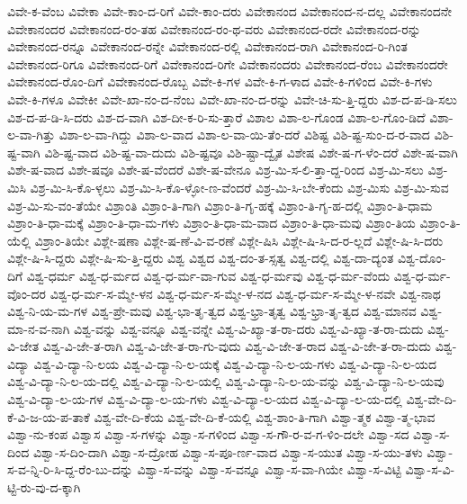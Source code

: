 {ವಿವೇ-ಕ-ವೆಂಬ
ವಿವೇಕಾ
ವಿವೇ-ಕಾಂ-ದ-ರಿಗೆ
ವಿವೇ-ಕಾಂ-ದರು
ವಿವೇಕಾನಂದ
ವಿವೇಕಾನಂದ-ನ-ದಲ್ಲ
ವಿವೇಕಾನಂದನೇ
ವಿವೇಕಾನಂದರ
ವಿವೇಕಾನಂದ-ರಂ-ತಹ
ವಿವೇಕಾನಂದ-ರಂ-ಥ-ವರು
ವಿವೇಕಾನಂದ-ರದೇ
ವಿವೇಕಾನಂದ-ರನ್ನು
ವಿವೇಕಾನಂದ-ರನ್ನೂ
ವಿವೇಕಾನಂದ-ರನ್ನೇ
ವಿವೇಕಾನಂದ-ರಲ್ಲಿ
ವಿವೇಕಾನಂದ-ರಾಗಿ
ವಿವೇಕಾನಂದ-ರಿ-ಗಿಂತ
ವಿವೇಕಾನಂದ-ರಿಗೂ
ವಿವೇಕಾನಂದ-ರಿಗೆ
ವಿವೇಕಾನಂದ-ರಿಗೇ
ವಿವೇಕಾನಂದರು
ವಿವೇಕಾನಂದ-ರೆಂಬ
ವಿವೇಕಾನಂದರೇ
ವಿವೇಕಾನಂದ-ರೊಂ-ದಿಗೆ
ವಿವೇಕಾನಂದ-ರೊಬ್ಬ
ವಿವೇ-ಕಿ-ಗಳ
ವಿವೇ-ಕಿ-ಗ-ಳಾದ
ವಿವೇ-ಕಿ-ಗಳಿಂದ
ವಿವೇ-ಕಿ-ಗಳು
ವಿವೇ-ಕಿ-ಗಳೂ
ವಿವೇಕೀ
ವಿವೇ-ಖಾ-ನಂ-ದ-ನೆಂಬ
ವಿವೇ-ಖಾ-ನಂ-ದ-ರನ್ನು
ವಿವೇ-ಚಿ-ಸು-ತ್ತಿ-ದ್ದರು
ವಿಶ-ದ-ಪ-ಡಿ-ಸಲು
ವಿಶ-ದ-ಪ-ಡಿ-ಸಿ-ದರು
ವಿಶ-ದ-ವಾಗಿ
ವಿಶ-ದೀ-ಕ-ರಿ-ಸು-ತ್ತಾರೆ
ವಿಶಾಲ
ವಿಶಾ-ಲ-ಗೊಂಡ
ವಿಶಾ-ಲ-ಗೊಂ-ಡಿದೆ
ವಿಶಾ-ಲ-ವಾ-ಗಿತ್ತು
ವಿಶಾ-ಲ-ವಾ-ಗಿದ್ದು
ವಿಶಾ-ಲ-ವಾದ
ವಿಶಾ-ಲ-ವಾ-ಯಿ-ತೆಂ-ದರೆ
ವಿಶಿಷ್ಟ
ವಿಶಿ-ಷ್ಟ-ಸುಂ-ದ-ರ-ವಾದ
ವಿಶಿ-ಷ್ಟ-ವಾಗಿ
ವಿಶಿ-ಷ್ಟ-ವಾದ
ವಿಶಿ-ಷ್ಟ-ವಾ-ದುದು
ವಿಶಿ-ಷ್ಟವೂ
ವಿಶಿ-ಷ್ಟಾ-ದ್ವೈತ
ವಿಶೇಷ
ವಿಶೇ-ಷ-ಗ-ಳೆಂ-ದರೆ
ವಿಶೇ-ಷ-ವಾಗಿ
ವಿಶೇ-ಷ-ವಾದ
ವಿಶೇ-ಷವೂ
ವಿಶೇ-ಷ-ವೆಂದರೆ
ವಿಶೇ-ಷ-ವೇನೂ
ವಿಶ್ರ-ಮಿ-ಸ-ಲಿ-ತ್ತಾ-ದ್ದ-ರಿಂದ
ವಿಶ್ರ-ಮಿ-ಸಲು
ವಿಶ್ರ-ಮಿಸಿ
ವಿಶ್ರ-ಮಿ-ಸಿ-ಕೊ-ಳ್ಳಲು
ವಿಶ್ರ-ಮಿ-ಸಿ-ಕೊ-ಳ್ಳೋ-ಣ-ವೆಂದರೆ
ವಿಶ್ರ-ಮಿ-ಸಿ-ಬೇ-ಕೆಂದು
ವಿಶ್ರ-ಮಿಸು
ವಿಶ್ರ-ಮಿ-ಸುವ
ವಿಶ್ರ-ಮಿ-ಸು-ವಂ-ತೆಯೇ
ವಿಶ್ರಾಂತಿ
ವಿಶ್ರಾಂ-ತಿ-ಗಾಗಿ
ವಿಶ್ರಾಂ-ತಿ-ಗೃ-ಹಕ್ಕೆ
ವಿಶ್ರಾಂ-ತಿ-ಗೃ-ಹ-ದಲ್ಲಿ
ವಿಶ್ರಾಂ-ತಿ-ಧಾಮ
ವಿಶ್ರಾಂ-ತಿ-ಧಾ-ಮಕ್ಕೆ
ವಿಶ್ರಾಂ-ತಿ-ಧಾ-ಮ-ಗಳು
ವಿಶ್ರಾಂ-ತಿ-ಧಾ-ಮ-ವಾದ
ವಿಶ್ರಾಂ-ತಿ-ಧಾ-ಮವು
ವಿಶ್ರಾಂ-ತಿಯ
ವಿಶ್ರಾಂ-ತಿ-ಯೆಲ್ಲಿ
ವಿಶ್ರಾಂ-ತಿಯೇ
ವಿಶ್ಲೇ-ಷಣಾ
ವಿಶ್ಲೇ-ಷ-ಣೆ-ವಿ-ವ-ರಣೆ
ವಿಶ್ಲೇ-ಷಿಸಿ
ವಿಶ್ಲೇ-ಷಿ-ಸಿ-ದ-ರ-ಲ್ಲದೆ
ವಿಶ್ಲೇ-ಷಿ-ಸಿ-ದರು
ವಿಶ್ಲೇ-ಷಿ-ಸಿ-ದ್ದರು
ವಿಶ್ಲೇ-ಷಿ-ಸು-ತ್ತಿ-ದ್ದರು
ವಿಶ್ವ
ವಿಶ್ವದ
ವಿಶ್ವ-ದಂ-ತ-ಸ್ಸತ್ವ
ವಿಶ್ವ-ದಲ್ಲಿ
ವಿಶ್ವ-ದಾ-ದ್ಯಂತ
ವಿಶ್ವ-ದೊಂ-ದಿಗೆ
ವಿಶ್ವ-ಧರ್ಮ
ವಿಶ್ವ-ಧ-ರ್ಮದ
ವಿಶ್ವ-ಧ-ರ್ಮ-ವಾ-ಗುವ
ವಿಶ್ವ-ಧ-ರ್ಮವು
ವಿಶ್ವ-ಧ-ರ್ಮ-ವೆಂದು
ವಿಶ್ವ-ಧ-ರ್ಮ-ವೊಂ-ದರ
ವಿಶ್ವ-ಧ-ರ್ಮ-ಸ-ಮ್ಮೇ-ಳನ
ವಿಶ್ವ-ಧ-ರ್ಮ-ಸ-ಮ್ಮೇ-ಳ-ನದ
ವಿಶ್ವ-ಧ-ರ್ಮ-ಸ-ಮ್ಮೇ-ಳ-ನವೇ
ವಿಶ್ವ-ನಾಥ
ವಿಶ್ವ-ನಿ-ಯ-ಮ-ಗಳ
ವಿಶ್ವ-ಪ್ರೇ-ಮವು
ವಿಶ್ವ-ಭಾ-ತೃ-ತ್ವದ
ವಿಶ್ವ-ಭ್ರಾ-ತೃತ್ವ
ವಿಶ್ವ-ಭ್ರಾ-ತೃ-ತ್ವದ
ವಿಶ್ವ-ಮಾನವ
ವಿಶ್ವ-ಮಾ-ನ-ವ-ನಾಗಿ
ವಿಶ್ವ-ವನ್ನು
ವಿಶ್ವ-ವನ್ನೂ
ವಿಶ್ವ-ವನ್ನೇ
ವಿಶ್ವ-ವಿ-ಖ್ಯಾ-ತ-ರಾ-ದರು
ವಿಶ್ವ-ವಿ-ಖ್ಯಾ-ತ-ರಾ-ದುದು
ವಿಶ್ವ-ವಿ-ಜೇತ
ವಿಶ್ವ-ವಿ-ಜೇ-ತ-ರಾಗಿ
ವಿಶ್ವ-ವಿ-ಜೇ-ತ-ರಾ-ಗು-ವುದು
ವಿಶ್ವ-ವಿ-ಜೇ-ತ-ರಾದ
ವಿಶ್ವ-ವಿ-ಜೇ-ತ-ರಾ-ದುದು
ವಿಶ್ವ-ವಿದ್ಯಾ
ವಿಶ್ವ-ವಿ-ದ್ಯಾ-ನಿ-ಲಯ
ವಿಶ್ವ-ವಿ-ದ್ಯಾ-ನಿ-ಲ-ಯಕ್ಕೆ
ವಿಶ್ವ-ವಿ-ದ್ಯಾ-ನಿ-ಲ-ಯ-ಗಳು
ವಿಶ್ವ-ವಿ-ದ್ಯಾ-ನಿ-ಲ-ಯದ
ವಿಶ್ವ-ವಿ-ದ್ಯಾ-ನಿ-ಲ-ಯ-ದಲ್ಲಿ
ವಿಶ್ವ-ವಿ-ದ್ಯಾ-ನಿ-ಲ-ಯಲ್ಲಿ
ವಿಶ್ವ-ವಿ-ದ್ಯಾ-ನಿ-ಲ-ಯ-ವನ್ನು
ವಿಶ್ವ-ವಿ-ದ್ಯಾ-ನಿ-ಲ-ಯವು
ವಿಶ್ವ-ವಿ-ದ್ಯಾ-ಲ-ಯ-ಗಳ
ವಿಶ್ವ-ವಿ-ದ್ಯಾ-ಲ-ಯ-ಗಳು
ವಿಶ್ವ-ವಿ-ದ್ಯಾ-ಲ-ಯದ
ವಿಶ್ವ-ವಿ-ದ್ಯಾ-ಲ-ಯ-ದಲ್ಲಿ
ವಿಶ್ವ-ವೇ-ದಿ-ಕೆ-ವಿ-ಜ-ಯ-ಪ-ತಾಕೆ
ವಿಶ್ವ-ವೇ-ದಿ-ಕೆಯ
ವಿಶ್ವ-ವೇ-ದಿ-ಕೆ-ಯಲ್ಲಿ
ವಿಶ್ವ-ಶಾಂ-ತಿ-ಗಾಗಿ
ವಿಶ್ವಾ-ತ್ಮಕ
ವಿಶ್ವಾ-ತ್ಮ-ಭಾವ
ವಿಶ್ವಾ-ನು-ಕಂಪ
ವಿಶ್ವಾಸ
ವಿಶ್ವಾ-ಸ-ಗಳನ್ನು
ವಿಶ್ವಾ-ಸ-ಗಳಿಂದ
ವಿಶ್ವಾ-ಸ-ಗೌ-ರ-ವ-ಗ-ಳಿಂ-ದಲೇ
ವಿಶ್ವಾ-ಸದ
ವಿಶ್ವಾ-ಸ-ದಿಂದ
ವಿಶ್ವಾ-ಸ-ದಿಂ-ದಾಗಿ
ವಿಶ್ವಾ-ಸ-ದ್ರೋಹ
ವಿಶ್ವಾ-ಸ-ಪೂ-ರ್ಣ-ವಾದ
ವಿಶ್ವಾ-ಸ-ಯುತ
ವಿಶ್ವಾ-ಸ-ಯು-ತಳು
ವಿಶ್ವಾ-ಸ-ವ-ನ್ನಿ-ರಿ-ಸಿ-ದ್ದ-ರೆಂ-ಬು-ದನ್ನು
ವಿಶ್ವಾ-ಸ-ವನ್ನು
ವಿಶ್ವಾ-ಸ-ವನ್ನೂ
ವಿಶ್ವಾ-ಸ-ವಾ-ಗಿಯೇ
ವಿಶ್ವಾ-ಸ-ವಿಟ್ಟಿ
ವಿಶ್ವಾ-ಸ-ವಿ-ಟ್ಟಿ-ರು-ವು-ದ-ಕ್ಕಾಗಿ
}
